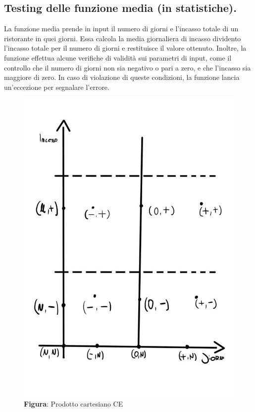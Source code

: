 \subsection{Testing delle funzione media (in statistiche).}
\begin{flushleft}
    La funzione media prende in input il numero di giorni e l'incasso totale di un ristorante in quei giorni.
     Essa calcola la media giornaliera di incasso dividento l'incasso totale per il numero di giorni e restituisce 
     il valore ottenuto. Inoltre, la funzione effettua alcune verifiche di validità sui parametri di input, come il 
     controllo che il numero di giorni non sia negativo o pari a zero, e che l'incasso sia maggiore di zero. In caso
      di violazione di queste condizioni, la funzione lancia un'eccezione per segnalare l'errore.
\end{flushleft}

\begin{figure}[H]
    \centering
    \includegraphics[scale=0.35]{assets/immagini varie/grafico media.jpeg}
    \caption*{\textbf{Figura}: Prodotto cartesiano CE}\label{fig:CE_graph}
\end{figure}

